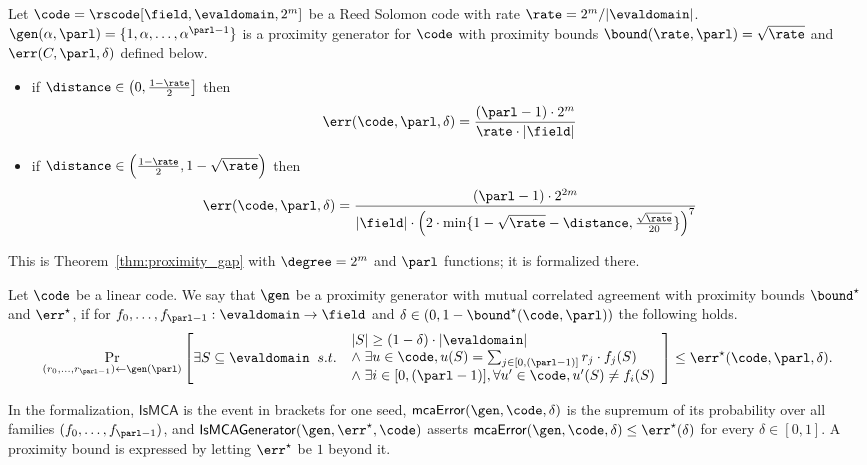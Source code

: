 \begin{theorem}\label{thm:proximity_gap_whir}
    Let $\code = \rscode[\field,\evaldomain,2^m]$ be a Reed Solomon code with rate $\rate = 2^m/|\evaldomain|$. $\gen(\alpha,\parl)=\{1,\alpha,\ldots,\alpha^{\parl-1}\}$ is a proximity generator for $\code$ with proximity bounds ${\bound}(\rate,\parl)=\sqrt{\rate}$ and $\err(C,\parl,\delta)$ defined below.
    \begin{itemize}
        \item if $\distance \in \left(0,\frac{1-\rate}{2}\right]$ then
            \[
                \err(\code,\parl,\delta)=\frac{(\parl-1)\cdot 2^m}{\rate\cdot|\field|}
            \]
        \item if $\distance \in \Bigl(\frac{1-\rate}{2}, 1-\sqrt{\rate}\Bigr)$ then
        \[
            \err(\code,\parl,\delta)=\frac{(\parl-1)\cdot 2^{2m}}{|\field|\cdot{\Bigl(2\cdot\min\{1-\sqrt{\rate}-\distance,\frac{\sqrt{\rate}}{20}\}\Bigr)}^7}
        \]
    \end{itemize}
    This is Theorem~\ref{thm:proximity_gap} with $\degree=2^m$ and $\parl$ functions; it is
    formalized there.
\end{theorem}

\begin{definition}\label{def:gen_mutual_corr_agreement}
\leanok
    Let $\code$ be a linear code. We say that $\gen$ be a proximity generator with mutual correlated agreement with proximity bounds ${\bound}^\star$ and $\err^\star$, if for $f_0,\ldots,f_{\parl-1}:\evaldomain\rightarrow\field$ and $\delta\in(0,1-{\bound}^\star(\code,\parl))$ the following holds.
    \[
    \Pr_{(r_0, \ldots, r_{\parl-1}) \leftarrow \gen(\parl)} \left[
        \exists S \subseteq \evaldomain \;\; s.t.\;\;
        \begin{array}{l}
        |S| \geq (1 - \delta) \cdot |\evaldomain| \\
        \land\; \exists u \in \code, u(S) = \sum_{j \in [0,(\parl-1)]} r_j \cdot f_j(S) \\
        \land\; \exists i \in [0,(\parl-1)], \forall u' \in \code, u'(S) \neq f_i(S)
        \end{array}\right]
    \leq \err^\star(\code, \parl, \delta).
    \]

    In the formalization, $\mathsf{IsMCA}$ is the event in brackets for one seed,
    $\mathsf{mcaError}(\gen,\code,\delta)$ is the supremum of its probability over all families
    $(f_0,\ldots,f_{\parl-1})$, and $\mathsf{IsMCAGenerator}(\gen,\err^\star,\code)$ asserts
    $\mathsf{mcaError}(\gen,\code,\delta)\le\err^\star(\delta)$ for every $\delta\in[0,1]$.
    A proximity bound is expressed by letting $\err^\star$ be $1$ beyond it.
\end{definition}

